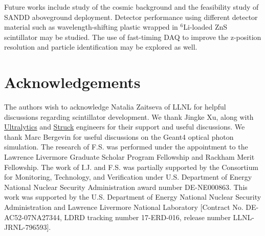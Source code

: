 \documentclass[final,5p,times,twocolumn]{elsarticle}
\begin{document}
Future works include study of the cosmic background and the feasibility study of SANDD aboveground deployment.
Detector performance using different detector material such as wavelength-shifting plastic wrapped in $^6$Li-loaded ZnS scintillator may be studied.
The use of fast-timing DAQ to improve the z-position resolution and particle identification may be explored as well.

\section{Acknowledgements}

The authors wish to acknowledge Natalia Zaitseva of LLNL for helpful discussions regarding scintillator development. We thank Jingke Xu, along with  \href{http://www.ultralytics.com/}{Ultralytics} and \href{https://www.struck.de/}{Struck} engineers for their support and useful discussions. We thank Marc Bergevin for useful discussions on the Geant4 optical photon simulation. The research of F.S. was performed under the appointment to the Lawrence Livermore Graduate Scholar Program Fellowship and Rackham Merit Fellowship. The work of I.J. and F.S. was partially supported by the Consortium for Monitoring, Technology, and Verification under U.S. Department of Energy National Nuclear Security Administration award number DE-NE000863. This work was supported by the U.S. Department of Energy National Nuclear Security Administration and Lawrence Livermore National Laboratory [Contract No. DE-AC52-07NA27344, LDRD tracking number 17-ERD-016, release number LLNL-JRNL-796593].


%


\end{document}
